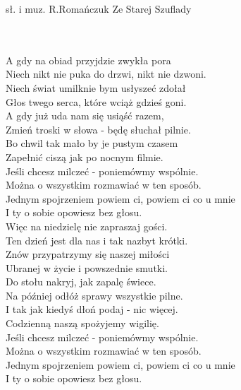 {sł. i muz. R.Romańczuk}
{Ze Starej Szuflady}
\begin{text}
\vin \\
\vin \\
A gdy na obiad przyjdzie zwykła pora  \\
Niech nikt nie puka do drzwi, nikt nie dzwoni. \\
Niech świat umilknie bym usłyszeć zdołał \\
Głos twego serca, które wciąż gdzieś goni.   \\

A gdy już uda nam się usiąść razem,\\
Zmień troski w słowa - będę słuchał pilnie.\\
Bo chwil tak mało by je pustym czasem\\
Zapełnić ciszą jak po nocnym filmie.\\

\vin Jeśli chcesz milczeć - poniemówmy wspólnie.\\
\vin Można o wszystkim rozmawiać w ten sposób.\\
\vin Jednym spojrzeniem powiem ci, powiem ci co u mnie\\
\vin I ty o sobie opowiesz bez głosu.\\

Więc na niedzielę nie zapraszaj gości.\\
Ten dzień jest dla nas i tak nazbyt krótki.\\
Znów przypatrzymy się naszej miłości\\
Ubranej w życie i powszednie smutki.\\

Do stołu nakryj, jak zapalę świece.\\
Na później odłóż sprawy wszystkie pilne.\\
I tak jak kiedyś dłoń podaj - nic więcej.\\
Codzienną naszą spożyjemy wigilię.\\

\vin Jeśli chcesz milczeć - poniemówmy wspólnie.\\
\vin Można o wszystkim rozmawiać w ten sposób.\\
\vin Jednym spojrzeniem powiem ci, powiem ci co u mnie\\
\vin I ty o sobie opowiesz bez głosu.\\

\end{text}
